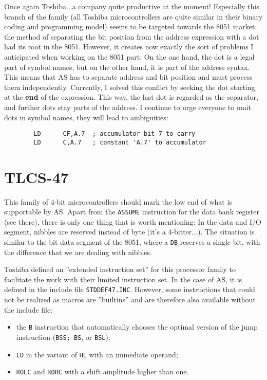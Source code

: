 \documentclass[12pt,twoside]{report}
\newcommand{\bb}[1]{{\bf #1}}
\newcommand{\tty}[1]{{\tt #1}}
\begin{document}
Once again Toshiba...a company quite productive at the moment!
Especially this branch of the family (all Toshiba microcontrollers
are quite similar in their binary coding and programming model) seems
to be targeted towards the 8051 market: the method of separating the
bit position from the address expression with a dot had its root in
the 8051.  However, it creates now exactly the sort of problems I
anticipated when working on the 8051 part: On the one hand, the dot
is a legal part of symbol names, but on the other hand, it is part of
the address syntax.  This means that AS has to separate address and
bit position and must process them independently.  Currently, I
solved this conflict by seeking the dot starting at the \bb{end} of the
expression.  This way, the last dot is regarded as the separator, and
further dots stay parts of the address.   I continue to urge everyone
to omit dots in symbol names, they will lead to ambiguities:
\begin{verbatim}
        LD      CF,A.7  ; accumulator bit 7 to carry
        LD      C,A.7   ; constant 'A.7' to accumulator
\end{verbatim}


\section{TLCS-47}

This family of 4-bit microcontrollers should mark the low end of what
is supportable by AS.  Apart from the \tty{ASSUME} instruction for the data
bank register (see there), there is only one thing that is worth
mentioning: In the data and I/O segment, nibbles are reserved instead
of byte (it's a 4-bitter...).  The situation is similar to the bit
data segment of the 8051, where a \tty{DB} reserves a single bit, with the
difference that we are dealing with nibbles.

Toshiba defined an ''extended instruction set'' for this processor
family to facilitate the work with their limited instruction set.  In
the case of AS, it is defined in the include file \tty{STDDEF47.INC}.
However, some instructions that could not be realized as macros are
''builtins'' and are therefore also available without the include file:
\begin{itemize}
\item{the \tty{B} instruction that automatically chooses the optimal version
      of the jump instruction (\tty{BSS; BS}, or \tty{BSL});}
\item{\tty{LD} in the variant of \tty{HL} with an immediate operand;}
\item{\tty{ROLC} and \tty{RORC} with a shift amplitude higher than one.}
\end{itemize}
\end{document}
